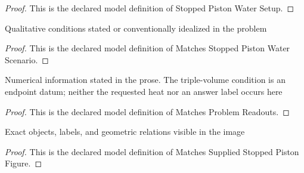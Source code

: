 \begin{proof}
  This is the declared model definition of Stopped Piston Water Setup.
\end{proof}
\begin{definition}
  \label{def:physics:phyx-mini-0463:phyxminiproblems-problemphyxmini0463-matchesstoppedpistonwaterscenario}
  Qualitative conditions stated or conventionally idealized in the problem
\end{definition}
\begin{proof}
  This is the declared model definition of Matches Stopped Piston Water Scenario.
\end{proof}
\begin{definition}
  \label{def:physics:phyx-mini-0463:phyxminiproblems-problemphyxmini0463-matchesproblemreadouts}
  Numerical information stated in the prose. The triple-volume condition is an endpoint datum; neither the requested heat nor an answer label occurs here
\end{definition}
\begin{proof}
  This is the declared model definition of Matches Problem Readouts.
\end{proof}
\begin{definition}
  \label{def:physics:phyx-mini-0463:phyxminiproblems-problemphyxmini0463-matchessuppliedstoppedpistonfigure}
  Exact objects, labels, and geometric relations visible in the image
\end{definition}
\begin{proof}
  This is the declared model definition of Matches Supplied Stopped Piston Figure.
\end{proof}
